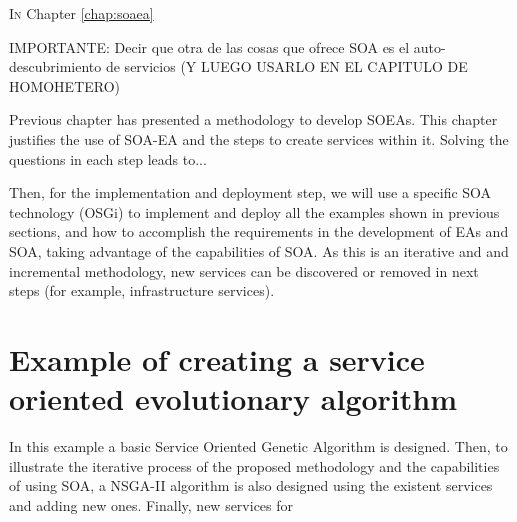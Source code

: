 \label{chap:osgiliath}


\minitoc\mtcskip
\vfill
\lettrine{I}{n} Chapter \ref{chap:soaea} %

IMPORTANTE: Decir que otra de las cosas que ofrece SOA es el auto-descubrimiento de servicios (Y LUEGO USARLO EN EL CAPITULO DE HOMOHETERO)

Previous chapter has presented a methodology to develop SOEAs. This chapter justifies the use of SOA-EA and the steps to create services within it. Solving the questions in each step leads to...

Then, for the implementation and deployment step, we will use a specific SOA technology (OSGi) to implement and deploy all the examples shown in previous sections, and how to accomplish the requirements in the development of EAs and SOA, taking advantage of the capabilities of SOA. As this is an iterative and and incremental methodology, new services can be discovered or removed in next steps (for example, infrastructure services).

\section{Example of creating a service oriented evolutionary algorithm}
\label{sec:soaea:creating}
 
In this example a basic Service Oriented Genetic Algorithm is designed. Then, to illustrate the iterative process of the proposed methodology and the capabilities of using SOA, a NSGA-II algorithm is also designed using the existent services and adding new ones. Finally, new services for 


